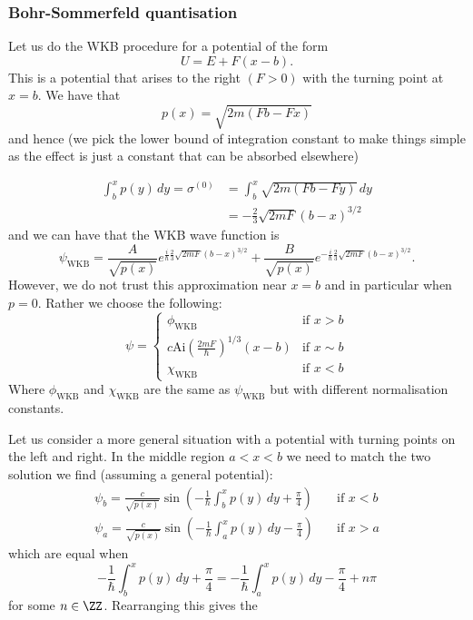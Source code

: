 \documentclass[12pt, a4paper]{article}
\begin{document}
\subsubsection{Bohr-Sommerfeld quantisation}

Let us do the WKB procedure for a potential of the form 
\[U = E+F(x-b).\]
This is a potential that arises to the right \((F>0)\) with the turning point at \(x=b\). We have that 
\[p(x) = \sqrt{2m(Fb-Fx)}\]
and hence (we pick the lower bound of integration constant to make things simple as the effect is just a constant that can be absorbed elsewhere)

\[\begin{aligned}
    \int_b^x p(y) \, dy =\sigma^{(0)} &= \int_{b}^{x} \sqrt{2m(Fb - Fy)} \,dy \\
    &= -\frac{2}{3}\sqrt{2mF}(b - x)^{3/2}
\end{aligned}\]
and we can have that the WKB wave function is
\[\psi_{\text{WKB}} = \frac{A}{\sqrt{p(x)}}e^{\frac{i}{\hbar} \frac{2}{3}\sqrt{2mF}(b-x)^{3/2}} + \frac{B}{\sqrt{p(x)}}e^{-\frac{i}{\hbar} \frac{2}{3}\sqrt{2mF}(b-x)^{3/2}}.\]
However, we do not trust this approximation near \(x=b\) and in particular when \(p=0\). Rather we choose the following:
\[\psi = \begin{cases}
    \phi_{\text{WKB}} &\text{if } x>b\\
    c \text{Ai}\left( \frac{2mF}{\hbar} \right)^{1/3}(x-b) &\text{if } x\sim b \\
    \chi_{\text{WKB}} &\text{if } x<b
\end{cases}\]
Where \(\phi_{\text{WKB}}\) and \(\chi_{\text{WKB}}\) are the same as \(\psi_{\text{WKB}}\) but with different normalisation constants.

Let us consider a more general situation with a potential with turning points on the left and right. In the middle region \(a<x<b\) we need to match the two solution we find (assuming a general potential):
\[
\begin{aligned}
    \psi_b = \frac{c}{\sqrt{p(x)}} \sin\left(-\frac{1}{\hbar} \int_{b}^{x} p(y)\, dy + \frac{\pi}{4}\right) \quad &\text{if } x < b \\
    \psi_a = \frac{c}{\sqrt{p(x)}} \sin\left(-\frac{1}{\hbar} \int_{a}^{x} p(y) \, dy - \frac{\pi}{4}\right)\quad  &\text{if } x > a
\end{aligned}
\]
which are equal when 
\[
-\frac{1}{\hbar} \int_{b}^{x} p(y) \, dy + \frac{\pi}{4} = -\frac{1}{\hbar} \int_{a}^{x} p(y) \,dy - \frac{\pi}{4} + n\pi
\]
for some \( n \in \ZZ\). Rearranging this gives the 
\end{document}
